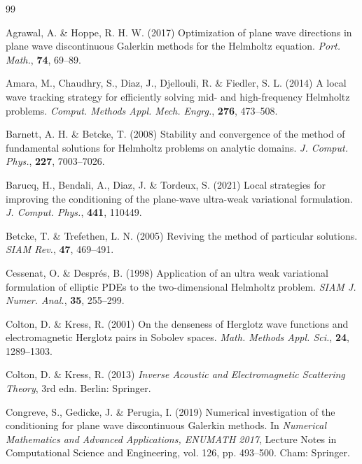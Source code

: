 \documentclass[11pt]{article}
\numberwithin{equation}{section}
\begin{document}
\begin{thebibliography}{99}

Agrawal, A. \& Hoppe, R. H. W. (2017) Optimization of plane wave directions in plane wave discontinuous Galerkin methods for the Helmholtz equation. \emph{Port. Math.}, \textbf{74}, 69--89.

Amara, M., Chaudhry, S., Diaz, J., Djellouli, R. \& Fiedler, S. L. (2014) A local wave tracking strategy for efficiently solving mid- and high-frequency Helmholtz problems. \emph{Comput. Methods Appl. Mech. Engrg.}, \textbf{276}, 473--508.

Barnett, A. H. \& Betcke, T. (2008) Stability and convergence of the method of fundamental solutions for Helmholtz problems on analytic domains. \emph{J. Comput. Phys.}, \textbf{227}, 7003--7026.

Barucq, H., Bendali, A., Diaz, J. \& Tordeux, S. (2021) Local strategies for improving the conditioning of the plane-wave ultra-weak variational formulation. \emph{J. Comput. Phys.}, \textbf{441}, 110449.

Betcke, T. \& Trefethen, L. N. (2005) Reviving the method of particular solutions. \emph{SIAM Rev.}, \textbf{47}, 469--491.

Cessenat, O. \& Despr\'es, B. (1998) Application of an ultra weak variational formulation of elliptic PDEs to the two-dimensional Helmholtz problem. \emph{SIAM J. Numer. Anal.}, \textbf{35}, 255--299.

Colton, D. \& Kress, R. (2001) On the denseness of Herglotz wave functions and electromagnetic Herglotz pairs in Sobolev spaces. \emph{Math. Methods Appl. Sci.}, \textbf{24}, 1289--1303.

Colton, D. \& Kress, R. (2013) \emph{Inverse Acoustic and Electromagnetic Scattering Theory}, 3rd edn. Berlin: Springer.

Congreve, S., Gedicke, J. \& Perugia, I. (2019) Numerical investigation of the conditioning for plane wave discontinuous Galerkin methods. In \emph{Numerical Mathematics and Advanced Applications, ENUMATH 2017}, Lecture Notes in Computational Science and Engineering, vol. 126, pp. 493--500. Cham: Springer.


\end{thebibliography}
\end{document}
